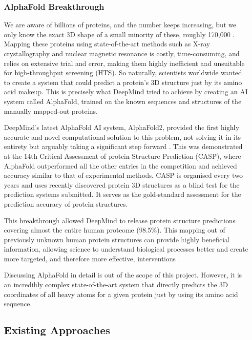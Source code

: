 \subsubsection{AlphaFold Breakthrough}
\label{subsubsec:AlphaFold}

We are aware of billions of proteins, and the number keeps increasing, but we only know the exact 3D shape of a small minority of these, roughly 170,000 \citep{Jumper2021}. Mapping these proteins using state-of-the-art methods such as X-ray crystallography and nuclear magnetic resonance is costly, time-consuming, and relies on extensive trial and error, making them highly inefficient and unsuitable for high-throughput screening (HTS). So naturally, scientists worldwide wanted to create a system that could predict a protein's 3D structure just by its amino acid makeup. This is precisely what DeepMind tried to achieve by creating an AI system called AlphaFold, trained on the known sequences and structures of the manually mapped-out proteins.

DeepMind's latest AlphaFold AI system, AlphaFold2, provided the first highly accurate and novel computational solution to this problem, not solving it in its entirety but arguably taking a significant step forward \citep{Jumper2021}. This was demonstrated at the 14th Critical Assessment of protein Structure Prediction (CASP), where AlphaFold outperformed all the other entries in the competition and achieved accuracy similar to that of experimental methods. CASP is organised every two years and uses recently discovered protein 3D structures as a blind test for the prediction systems submitted. It serves as the gold-standard assessment for the prediction accuracy of protein structures.

This breakthrough allowed DeepMind to release protein structure predictions covering almost the entire human proteome (98.5\%). This mapping out of previously unknown human protein structures can provide highly beneficial information, allowing science to understand biological processes better and create more targeted, and therefore more effective, interventions \citep{Tunyasuvunakool2021}. 

Discussing AlphaFold in detail is out of the scope of this project. However, it is an incredibly complex state-of-the-art system that directly predicts the 3D coordinates of all heavy atoms for a given protein just by using its amino acid sequence. 

\subsection{Existing Approaches}
\label{subsec:Existing_Approaches}

